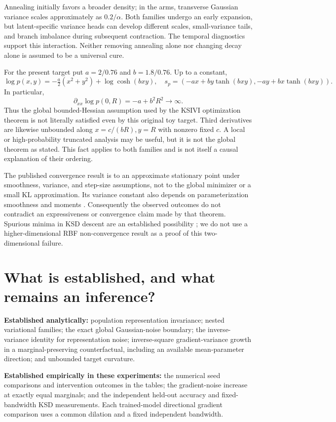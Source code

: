 \documentclass[11pt,a4paper]{article}
\numberwithin{equation}{section}
\begin{document}
Annealing initially favors a broader density; in the arms, transverse Gaussian
variance scales approximately as $0.2/\alpha$. Both families undergo an early
expansion, but latent-specific variance heads can develop different scales,
small-variance tails, and branch imbalance during subsequent contraction.
The temporal diagnostics support this interaction. Neither removing
annealing alone nor changing decay alone is assumed to be a universal cure.

For the present target put $a=2/0.76$ and $b=1.8/0.76$. Up to a constant,
\[
 \log p(x,y)=-\tfrac a2(x^2+y^2)+\log\cosh(bxy),
 \quad s_p=(-ax+by\tanh(bxy),-ay+bx\tanh(bxy)).
\]
In particular,
\[
 \partial_{xx}\log p(0,R)=-a+b^2R^2\longrightarrow\infty.
\]
Thus the global bounded-Hessian assumption used by the KSIVI optimization
theorem is not literally satisfied even by this original toy target. Third
derivatives are likewise unbounded along $x=c/(bR),y=R$ with nonzero fixed
$c$. A local or high-probability truncated analysis may be useful, but it is
not the global theorem as stated. This fact applies to both families and is
not itself a causal explanation of their ordering.

The published convergence result is to an approximate stationary point under
smoothness, variance, and step-size assumptions, not to the global minimizer
or a small KL approximation. Its variance constant also depends on
parameterization smoothness and moments \cite{cheng,yu}. Consequently the
observed outcomes do not contradict an expressiveness or convergence claim
made by that theorem. Spurious minima in KSD descent are an established
possibility \cite{korba}; we do not use a higher-dimensional RBF
non-convergence result as a proof of this two-dimensional failure.

\section{What is established, and what remains an inference?}
\textbf{Established analytically:} population representation invariance;
nested variational families; the exact global Gaussian-noise boundary;
the inverse-variance identity for representation noise; inverse-square
gradient-variance growth in a marginal-preserving counterfactual, including
an available mean-parameter direction; and unbounded target curvature.

\textbf{Established empirically in these experiments:} the numerical seed
comparisons and intervention outcomes in the tables; the gradient-noise
increase at exactly equal marginals; and the independent held-out accuracy
and fixed-bandwidth KSD measurements. Each trained-model directional gradient
comparison uses a common dilation and a fixed independent bandwidth.
\end{document}
